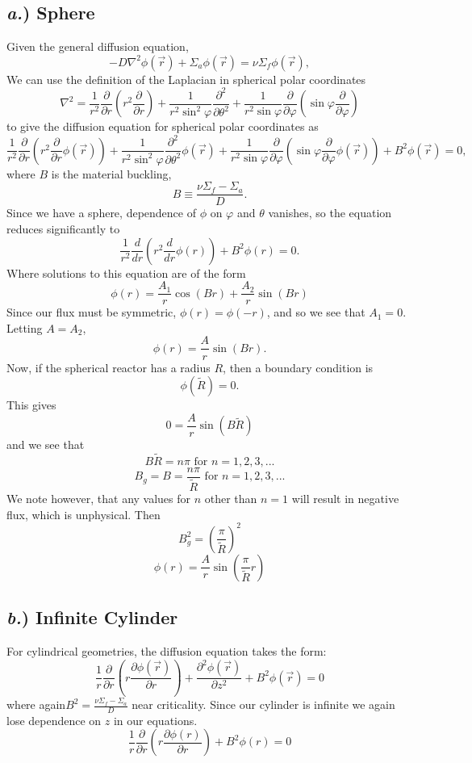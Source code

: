 \documentclass{article}
\newcommand{\p}{\partial}
\newcommand{\Xs}{\Sigma}
\newcommand{\pos}{\vec{r}}
\begin{document}
\subsection*{\textit{a.}) Sphere}
Given the general diffusion equation,
$$ -D \nabla^2 \phi(\pos) + \Xs_a \phi(\pos) = \nu \Xs_f\phi(\pos), $$
We can use the definition of the Laplacian in spherical polar coordinates 
$$ \nabla^2 = \frac{1}{r^2}\frac{\p}{\p r}\left( r^2 \frac{\p}{\p r}\right) + \frac{1}{r^2 \sin^2\varphi}\frac{\p^2}{\p \theta^2} + \frac{1}{r^2 \sin\varphi} \frac{\p}{\p \varphi}\left(\sin\varphi \frac{\p}{\p \varphi}\right) $$ 
to give the diffusion equation for spherical polar coordinates as
$$ \frac{1}{r^2}\frac{\p}{\p r}\left( r^2 \frac{\p}{\p r} \phi(\pos)\right) + \frac{1}{r^2 \sin^2\varphi}\frac{\p^2}{\p \theta^2} \phi(\pos) + \frac{1}{r^2 \sin\varphi} \frac{\p}{\p \varphi}\left(\sin\varphi \frac{\p}{\p \varphi}\phi(\pos)\right) + B^2 \phi(\pos) = 0 ,$$
where $B$ is the material buckling,
$$ B \equiv \frac{\nu \Xs_f - \Xs_a}{D} .$$
Since we have a sphere, dependence of $\phi$ on $\varphi$ and $\theta$ vanishes, so the equation reduces significantly to
$$ \frac{1}{r^2}\frac{d}{dr} \left( r^2 \frac{d}{dr} \phi(r)\right) + B^2 \phi(r) = 0 .$$
Where solutions to this equation are of the form 
$$ \phi(r) = \frac{A_1}{r}\cos(Br) + \frac{A_2}{r}\sin(Br)  $$
Since our flux must be symmetric, $\phi(r) = \phi(-r)$, and so we see that $A_1 = 0$. Letting $A = A_2$,
$$ \phi(r) = \frac{A}{r}\sin(Br) .$$
Now, if the spherical reactor has a radius $R$, then a boundary condition is
$$ \phi(\tilde{R}) = 0 .$$
This gives
$$ 0 = \frac{A}{r}\sin(B\tilde{R}) $$
and we see that 
$$ B\tilde{R} = n\pi \text{ for }n = 1,2,3, ...$$
$$ B_g = B = \frac{n\pi}{\tilde{R}} \text{ for }n = 1,2,3, ...$$
We note however, that any values for $n$ other than $n=1$ will result in negative flux, which is unphysical. Then
$$\boxed{ B_g^2 = \left(\frac{\pi}{\tilde{R}}\right)^2 }$$
$$\boxed{ \phi(r) = \frac{A}{r}\sin\left(\frac{\pi}{\tilde{R}}r \right) }$$

\subsection*{\textit{b.}) Infinite Cylinder}

For cylindrical geometries, the diffusion equation takes the form:
$$ \frac{1}{r}\frac{\p}{\p r}\left(r \frac{\p \phi(\pos)}{\p r}\right) + \frac{\p^2 \phi(\pos)}{\p z^2} + B^2\phi(\pos) = 0$$
where again$ B^2 = \frac{\nu\Sigma_f - \Sigma_a}{D} $ near criticality. 
Since our cylinder is infinite we again lose dependence on $z$ in our equations.
$$ \frac{1}{r}\frac{\p}{\p r}\left(r \frac{\p \phi(r)}{\p r}\right) + B^2\phi(r) = 0$$
\end{document}

